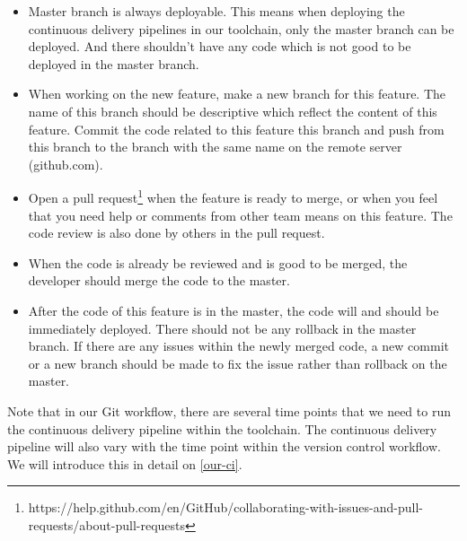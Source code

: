\begin{itemize}
    \item Master branch is always deployable. This means when deploying the continuous delivery pipelines in our toolchain, only the master branch can be deployed. And there shouldn't have any code which is not good to be deployed in the master branch. 
    \item When working on the new feature, make a new branch for this feature. The name of this branch should be descriptive which reflect the content of this feature. Commit the code related to this feature this branch and push from this branch to the branch with the same name on the remote server (github.com).
    \item Open a pull request\footnote{https://help.github.com/en/GitHub/collaborating-with-issues-and-pull-requests/about-pull-requests} when the feature is ready to merge, or when you feel that you need help or comments from other team means on this feature. The code review is also done by others in the pull request.
    \item When the code is already be reviewed and is good to be merged, the developer should merge the code to the master.
    \item After the code of this feature is in the master, the code will and should be immediately deployed. There should not be any rollback in the master branch. If there are any issues within the newly merged code, a new commit or a new branch should be made to fix the issue rather than rollback on the master.
\end{itemize}
\par
Note that in our Git workflow, there are several time points that we need to run the continuous delivery pipeline within the toolchain. The continuous delivery pipeline will also vary with the time point within the version control workflow. We will introduce this in detail on \ref{our-ci}.

